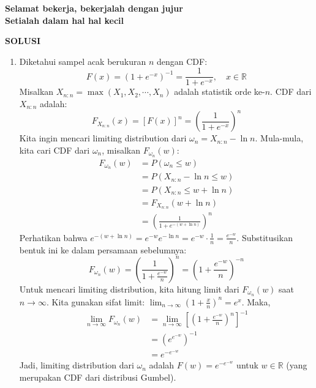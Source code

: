 \documentclass[11pt,letterpaper]{article}
\begin{document}
\vspace{0.5cm}
\begin{center}
  \textbf{Selamat bekerja, bekerjalah dengan jujur} \\
  \vspace{0.2cm}
  \textbf{Setialah dalam hal hal kecil}
\end{center}

\newpage
\begin{center}
  \textbf{\large SOLUSI}
\end{center}

\begin{enumerate}
  \item 
  Diketahui sampel acak berukuran $n$ dengan CDF:
  \[ F(x) = (1 + e^{-x})^{-1} = \frac{1}{1 + e^{-x}}, \quad x \in \mathbb{R} \]
  Misalkan $X_{n:n} = \max(X_1, X_2, \cdots, X_n)$ adalah statistik orde ke-$n$.
  CDF dari $X_{n:n}$ adalah:
  \[ F_{X_{n:n}}(x) = [F(x)]^n = \left( \frac{1}{1 + e^{-x}} \right)^n \]
  Kita ingin mencari limiting distribution dari $\omega_n = X_{n:n} - \ln n$.
  Mula-mula, kita cari CDF dari $\omega_n$, misalkan $F_{\omega_n}(w)$:
  \begin{align*}
    F_{\omega_n}(w) &= P(\omega_n \le w) \\
    &= P(X_{n:n} - \ln n \le w) \\
    &= P(X_{n:n} \le w + \ln n) \\
    &= F_{X_{n:n}}(w + \ln n) \\
    &= \left( \frac{1}{1 + e^{-(w + \ln n)}} \right)^n
  \end{align*}
  Perhatikan bahwa $e^{-(w + \ln n)} = e^{-w} e^{-\ln n} = e^{-w} \cdot \frac{1}{n} = \frac{e^{-w}}{n}$.
  Substitusikan bentuk ini ke dalam persamaan sebelumnya:
  \[ F_{\omega_n}(w) = \left( \frac{1}{1 + \frac{e^{-w}}{n}} \right)^n = \left( 1 + \frac{e^{-w}}{n} \right)^{-n} \]
  Untuk mencari limiting distribution, kita hitung limit dari $F_{\omega_n}(w)$ saat $n \to \infty$. 
  Kita gunakan sifat limit: $\lim_{n \to \infty} \left(1 + \frac{x}{n}\right)^n = e^x$.
  Maka,
  \begin{align*}
    \lim_{n \to \infty} F_{\omega_n}(w) &= \lim_{n \to \infty} \left[ \left( 1 + \frac{e^{-w}}{n} \right)^n \right]^{-1} \\
    &= \left( e^{e^{-w}} \right)^{-1} \\
    &= e^{-e^{-w}}
  \end{align*}
  Jadi, limiting distribution dari $\omega_n$ adalah $F(w) = e^{-e^{-w}}$ untuk $w \in \mathbb{R}$ (yang merupakan CDF dari distribusi Gumbel).


\end{enumerate}
\end{document}
